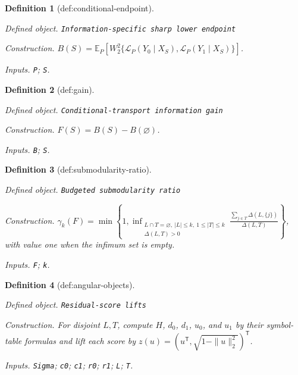 \documentclass{article}
\newtheorem{definition}{Definition}
\begin{document}
\begin{definition}[def:conditional-endpoint]\label{def:conditional-endpoint}
\par\smallskip\noindent\emph{Defined object.} \texttt{Information-\allowbreak{}specific sharp lower endpoint}
\par\smallskip\noindent\emph{Construction.} \(B(S)=\mathbb E_P\!\left[W_2^2\{\mathcal L_P(Y_0\mid X_S),\mathcal L_P(Y_1\mid X_S)\}\right]\).
\par\smallskip\noindent\emph{Inputs.} \texttt{P}; \texttt{S}.
\end{definition}

\begin{definition}[def:gain]\label{def:gain}
\par\smallskip\noindent\emph{Defined object.} \texttt{Conditional-\allowbreak{}transport information gain}
\par\smallskip\noindent\emph{Construction.} \(F(S)=B(S)-B(\varnothing)\).
\par\smallskip\noindent\emph{Inputs.} \texttt{B}; \texttt{S}.
\end{definition}

\begin{definition}[def:submodularity-ratio]\label{def:submodularity-ratio}
\par\smallskip\noindent\emph{Defined object.} \texttt{Budgeted submodularity ratio}
\par\smallskip\noindent\emph{Construction.} \(\gamma_k(F)=\min\!\left\{1,\inf_{\substack{L\cap T=\varnothing,\ |L|\le k,\ 1\le|T|\le k\\ \Delta(L,T)>0}}\frac{\sum_{j\in T}\Delta(L,\{j\})}{\Delta(L,T)}\right\}\), with value one when the infimum set is empty.
\par\smallskip\noindent\emph{Inputs.} \texttt{F}; \texttt{k}.
\end{definition}

\begin{definition}[def:angular-objects]\label{def:angular-objects}
\par\smallskip\noindent\emph{Defined object.} \texttt{Residual-\allowbreak{}score lifts}
\par\smallskip\noindent\emph{Construction.} For disjoint \(L,T\), compute \(H\), \(d_0\), \(d_1\), \(u_0\), and \(u_1\) by their symbol-table formulas and lift each score by \(z(u)=(u^{\mathsf T},\sqrt{1-\|u\|_2^2})^{\mathsf T}\).
\par\smallskip\noindent\emph{Inputs.} \texttt{Sigma}; \texttt{c0}; \texttt{c1}; \texttt{r0}; \texttt{r1}; \texttt{L}; \texttt{T}.
\end{definition}
\end{document}
